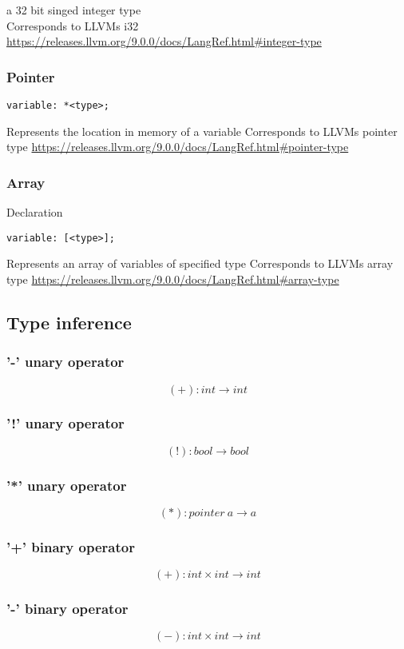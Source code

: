\documentclass{article}
\begin{document}
a 32 bit singed integer type \\
Corresponds to LLVMs i32 \url{https://releases.llvm.org/9.0.0/docs/LangRef.html#integer-type}
\subsubsection{Pointer}
\begin{verbatim}
variable: *<type>;
\end{verbatim}
Represents the location in memory of a variable
Corresponds to LLVMs pointer type \url{https://releases.llvm.org/9.0.0/docs/LangRef.html#pointer-type}
\subsubsection{Array}
Declaration 
\begin{verbatim}
variable: [<type>];
\end{verbatim}
Represents an array of variables of specified type
Corresponds to LLVMs array type \url{https://releases.llvm.org/9.0.0/docs/LangRef.html#array-type}

\subsection{Type inference}


\subsubsection{'-' unary operator}
$$
(+): int \longrightarrow int
$$

\subsubsection{'!' unary operator}
$$
(!): bool \longrightarrow bool
$$

\subsubsection{'*' unary operator}
$$
(*): pointer \ a \longrightarrow a
$$

\subsubsection{'+' binary operator}
$$
(+): int \times int \longrightarrow int
$$

\subsubsection{'-' binary operator}
$$
(-): int \times int \longrightarrow int
$$
\end{document}
